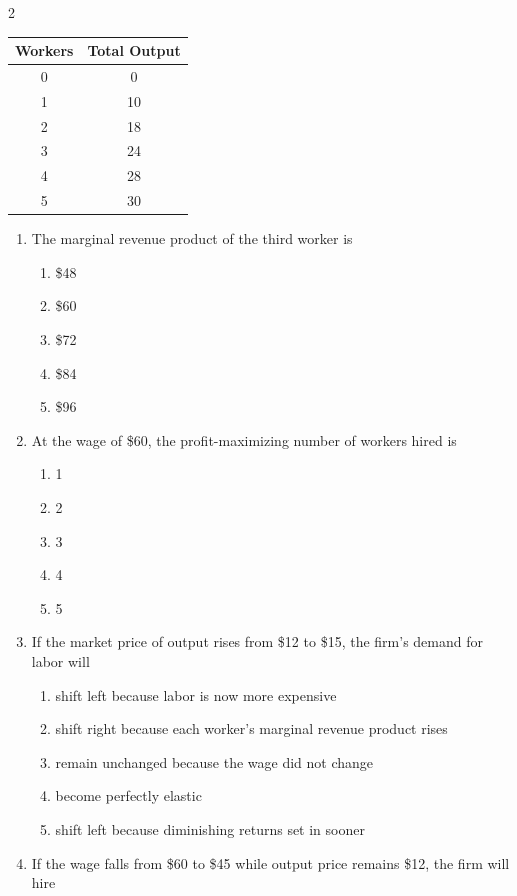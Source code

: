 \documentclass[10pt]{article}
\newenvironment{choiceslist}
  {\begin{enumerate}[label=(\Alph*), leftmargin=1.6em, itemsep=0.12em, topsep=0.18em, parsep=0pt]}
  {\end{enumerate}}
\newenvironment{stimulus}
  {\begin{center}\begin{minipage}{0.96\columnwidth}\footnotesize\itshape\setlength{\tabcolsep}{3pt}\renewcommand{\arraystretch}{0.96}}
  {\end{minipage}\end{center}}
\begin{document}
\begin{multicols*}{2}
\begin{stimulus}
\begin{center}
\begin{tabular}{cc}
\toprule
Workers & Total Output \\
\midrule
0 & 0 \\
1 & 10 \\
2 & 18 \\
3 & 24 \\
4 & 28 \\
5 & 30 \\
\bottomrule
\end{tabular}
\end{center}
\end{stimulus}
\begin{enumerate}[resume*=apq, leftmargin=*, itemsep=0.85em, topsep=0.2em, parsep=0pt]
\item The marginal revenue product of the third worker is
\begin{choiceslist}
\item \$48
\item \$60
\item \$72
\item \$84
\item \$96
\end{choiceslist}
\item At the wage of \$60, the profit-maximizing number of workers hired is
\begin{choiceslist}
\item 1
\item 2
\item 3
\item 4
\item 5
\end{choiceslist}
\item If the market price of output rises from \$12 to \$15, the firm's demand for labor will
\begin{choiceslist}
\item shift left because labor is now more expensive
\item shift right because each worker's marginal revenue product rises
\item remain unchanged because the wage did not change
\item become perfectly elastic
\item shift left because diminishing returns set in sooner
\end{choiceslist}
\item If the wage falls from \$60 to \$45 while output price remains \$12, the firm will hire
\begin{choiceslist}

\end{choiceslist}
\end{enumerate}
\end{multicols*}
\end{document}
